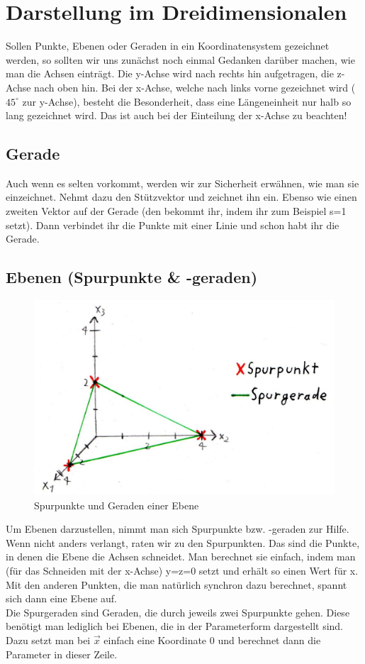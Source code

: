 \section{Darstellung im Dreidimensionalen}
Sollen Punkte, Ebenen oder Geraden in ein Koordinatensystem gezeichnet werden, so sollten wir uns zunächst noch einmal Gedanken darüber machen, wie man die Achsen einträgt. Die y-Achse wird nach rechts hin aufgetragen, die z-Achse nach oben hin. Bei der x-Achse, welche nach links vorne gezeichnet wird (\(45^{\circ}\) zur y-Achse), besteht die Besonderheit, dass eine Längeneinheit nur halb so lang gezeichnet wird. Das ist auch bei der Einteilung der x-Achse zu beachten!

\subsection{Gerade}
Auch wenn es selten vorkommt, werden wir zur Sicherheit erwähnen, wie man sie einzeichnet. Nehmt dazu den Stützvektor und zeichnet ihn ein. Ebenso wie einen zweiten Vektor auf der Gerade (den bekommt ihr, indem ihr zum Beispiel s=1 setzt). Dann verbindet ihr die Punkte mit einer Linie und schon habt ihr die Gerade. 

\subsection{Ebenen (Spurpunkte \& -geraden)}

    \begin{figure}[h]
    \centering
    \includegraphics[scale=0.2]{Images/Spurpunkte.jpeg}
    \caption{Spurpunkte und Geraden einer Ebene}
    \end{figure}

Um Ebenen darzustellen, nimmt man sich Spurpunkte bzw. -geraden zur Hilfe. Wenn nicht anders verlangt, raten wir zu den Spurpunkten. Das sind die Punkte, in denen die Ebene die Achsen schneidet. Man berechnet sie einfach, indem man (für das Schneiden mit der x-Achse) y=z=0 setzt und erhält so einen Wert für x. Mit den anderen Punkten, die man natürlich synchron dazu berechnet, spannt sich dann eine Ebene auf.\\
Die Spurgeraden sind Geraden, die durch jeweils zwei Spurpunkte gehen. Diese benötigt man lediglich bei Ebenen, die in der Parameterform dargestellt sind. Dazu setzt man bei \(\vec{x}\) einfach eine Koordinate 0 und berechnet dann die Parameter in dieser Zeile.

